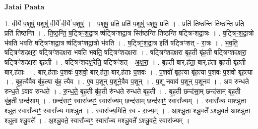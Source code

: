 \documentclass[17pt]{extarticle}
\begin{document}
\textbf{Jatai Paata} \newline

1. वी॒र्ये॑ प॒शुषु॑ प॒शुषु॑ वी॒र्ये॑ वी॒र्ये॑ प॒शुषु॑ । . प॒शुषु॒ प्रति॒ प्रति॑ प॒शुषु॑ प॒शुषु॒ प्रति॑ । . प्रति॑ तिष्ठन्ति तिष्ठन्ति॒ प्रति॒ प्रति॑ तिष्ठन्ति । . ति॒ष्ठ॒न्ति॒ ष॒ट्त्रिꣳ॒॒श॒द्रा॒त्र ष्ष॑ट्त्रिꣳशद्रा॒त्र स्ति॑ष्ठन्ति तिष्ठन्ति षट्त्रिꣳशद्रा॒त्रः । . ष॒ट्त्रिꣳ॒॒श॒द्रा॒त्रो भ॑वति भवति षट्त्रिꣳशद्रा॒त्र ष्ष॑ट्त्रिꣳशद्रा॒त्रो भ॑वति । . ष॒ट्त्रिꣳ॒॒श॒द्रा॒त्र इति॑ षट्त्रिꣳशत् - रा॒त्रः । . भ॒व॒ति॒ षट्त्रिꣳ॑शदक्षरा॒ षट्त्रिꣳ॑शदक्षरा भवति भवति॒ षट्त्रिꣳ॑शदक्षरा । . षट्त्रिꣳ॑शदक्षरा बृह॒ती बृ॑ह॒ती षट्त्रिꣳ॑शदक्षरा॒ षट्त्रिꣳ॑शदक्षरा बृह॒ती । . षट्त्रिꣳ॑शदक्ष॒रेति॒ षट्त्रिꣳ॑शत् - अ॒क्ष॒रा॒ । . बृ॒ह॒ती बार्.ह॑ता॒ बार्.ह॑ता बृह॒ती बृ॑ह॒ती बार्.ह॑ताः । . बार्.ह॑ताः प॒शवः॑ प॒शवो॒ बार्.ह॑ता॒ बार्.ह॑ताः प॒शवः॑ । . प॒शवो॑ बृह॒त्या बृ॑ह॒त्या प॒शवः॑ प॒शवो॑ बृह॒त्या । . बृ॒ह॒त्यैवैव बृ॑ह॒त्या बृ॑ह॒ त्यैव । . ए॒व प॒शून् प॒शूने॒वैव प॒शून् । . प॒शू नवाव॑ प॒शून् प॒शूनव॑ । . अव॑ रुन्धते रुन्ध॒ते ऽवाव॑ रुन्धते । . रु॒न्ध॒ते॒ बृ॒ह॒ती बृ॑ह॒ती रु॑न्धते रुन्धते बृह॒ती । . बृ॒ह॒ती छन्द॑सा॒म् छन्द॑साम् बृह॒ती बृ॑ह॒ती छन्द॑साम् । . छन्द॑साꣳ॒॒ स्वारा᳚ज्यꣳ॒॒ स्वारा᳚ज्य॒म् छन्द॑सा॒म् छन्द॑साꣳ॒॒ स्वारा᳚ज्यम् । . स्वारा᳚ज्य माश्ञुता श्ञुत॒ स्वारा᳚ज्यꣳ॒॒ स्वारा᳚ज्य माश्ञुत । . स्वारा᳚ज्य॒मिति॒ स्व - रा॒ज्य॒म् । . आ॒श्ञु॒ता॒ श्ञु॒वते᳚ ऽश्ञु॒वत॑ आश्ञुता श्ञुता श्ञु॒वते᳚ । . अ॒श्ञु॒वते॒ स्वारा᳚ज्यꣳ॒॒ स्वारा᳚ज्य मश्ञु॒वते᳚ ऽश्ञु॒वते॒ स्वारा᳚ज्यम् । \newline
\end{document}
